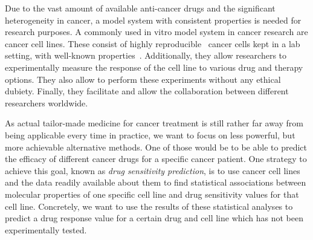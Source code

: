Due to the vast amount of available anti-cancer drugs and the significant heterogeneity in cancer, a model system with consistent properties is needed for research purposes.
A commonly used in vitro model system in cancer research are cancer cell lines.
These consist of highly reproducible~\cite{cancer_cell_lines_useful_model} cancer cells kept in a lab setting, with well-known properties~\cite{cancer_cell_line_definition,cancer_cell_lines_useful_model}.
Additionally, they allow researchers to experimentally measure the response of the cell line to various drug and therapy options.
They also allow to perform these experiments without any ethical dubiety.
Finally, they facilitate and allow the collaboration between different researchers worldwide.

As actual tailor-made medicine for cancer treatment is still rather far away from being applicable every time in practice, we want to focus on less powerful, but more achievable alternative methods.
One of those would be to be able to predict the efficacy of different cancer drugs for a specific cancer patient.
One strategy to achieve this goal, known as \textit{drug sensitivity prediction}, is to use cancer cell lines and the data readily available about them to find statistical associations between molecular properties of one specific cell line and drug sensitivity values for that cell line.
Concretely, we want to use the results of these statistical analyses to predict a drug response value for a certain drug and cell line which has not been experimentally tested.

